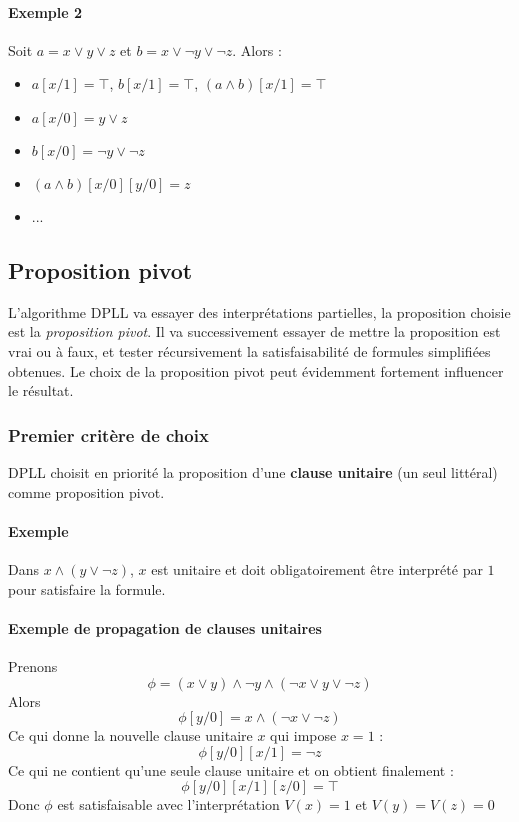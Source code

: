 \documentclass[a4paper]{article}
\begin{document}
    \paragraph{Exemple 2} Soit $a = x \lor y \lor z$ et $b = x \lor \lnot y \lor \lnot z$. Alors :
    \begin{itemize}
      \item $a[x/1] = \top$, $b[x/1] = \top$, $(a \land b)[x/1] = \top$
      \item $a[x/0] = y \lor z$
      \item $b[x/0] = \lnot y \lor \lnot z$
      \item $(a \land b)[x/0][y/0] = z$
      \item ...
    \end{itemize}

  \subsection{Proposition pivot}
  L'algorithme DPLL va essayer des interprétations partielles, la proposition choisie
  est la \textit{proposition pivot}. Il va successivement essayer de mettre la 
  proposition est vrai ou à faux, et tester récursivement la satisfaisabilité de formules
  simplifiées obtenues. Le choix de la proposition pivot peut évidemment fortement
  influencer le résultat.

  \subsubsection{Premier critère de choix}
  DPLL choisit en priorité la proposition d'une \textbf{clause unitaire} (un seul littéral)
  comme proposition pivot. 

  \paragraph{Exemple} Dans $x \land (y \lor \lnot z)$, $x$ est unitaire et doit 
  obligatoirement être interprété par $1$ pour satisfaire la formule.

  \paragraph{Exemple de propagation de clauses unitaires}
  Prenons $$\phi = (x\lor y) \land \lnot y \land (\lnot x \lor y \lor \lnot z)$$
  Alors $$ \phi[y/0] = x \land (\lnot x \lor \lnot z) $$
  Ce qui donne la nouvelle clause unitaire $x$ qui impose $ x = 1 $ :
  $$ \phi[y/0][x/1] =  \lnot z$$ 
  Ce qui ne contient qu'une seule clause unitaire et on obtient finalement :
  $$ \phi[y/0][x/1][z/0] = \top $$
  Donc $\phi$ est satisfaisable avec l'interprétation $V(x) = 1$ et $V(y) = V(z) = 0$
\end{document}
